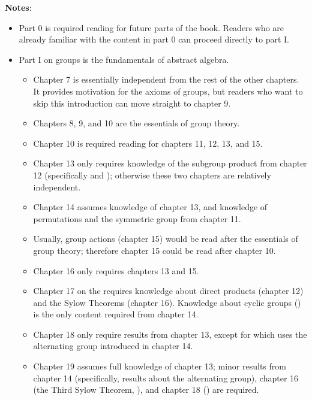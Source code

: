 \newpage
\begin{center}
\end{center}

\newpage

\textbf{Notes}:
\begin{itemize}
    \item Part 0 is required reading for future parts of the book. Readers who are already familiar with the content in part 0 can proceed directly to part I.
    \item Part I on groups is the fundamentals of abstract algebra.
    \begin{itemize}
        \item Chapter 7 is essentially independent from the rest of the other chapters. It provides motivation for the axioms of groups, but readers who want to skip this introduction can move straight to chapter 9.
        \item Chapters 8, 9, and 10 are the essentials of group theory.
        \item Chapter 10 is required reading for chapters 11, 12, 13, and 15.
        \item Chapter 13 only requires knowledge of the subgroup product from chapter 12 (specifically  and ); otherwise these two chapters are relatively independent.
        \item Chapter 14 assumes knowledge of chapter 13, and knowledge of permutations and the symmetric group from chapter 11.
        \item Usually, group actions (chapter 15) would be read after the essentials of group theory; therefore chapter 15 could be read after chapter 10.
        \item Chapter 16 only requires chapters 13 and 15.
        \item Chapter 17 on the requires knowledge about direct products (chapter 12) and the Sylow Theorems (chapter 16). Knowledge about cyclic groups () is the only content required from chapter 14.
        \item Chapter 18 only require results from chapter 13, except for  which uses the alternating group introduced in chapter 14.
        \item Chapter 19 assumes full knowledge of chapter 13; minor results from chapter 14 (specifically, results about the alternating group), chapter 16 (the Third Sylow Theorem, ), and chapter 18 () are required.

\end{itemize}
\end{itemize}
